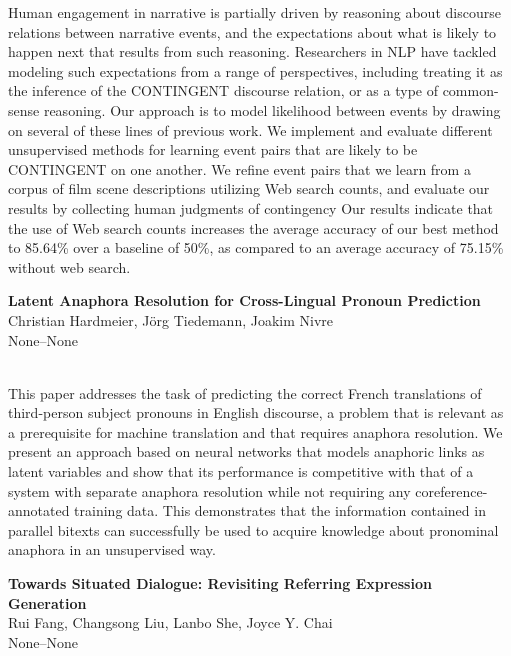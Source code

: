 \documentclass[twoside,makeidx]{book}
\begin{document}
\nopagebreak%
\noindent%
{\small Human engagement in narrative is partially driven by reasoning about discourse relations between narrative events, and the expectations about what is likely to happen next that results from such reasoning. Researchers in NLP have tackled modeling such expectations from a range of perspectives, including treating it as the inference of the CONTINGENT discourse relation, or as a type of common-sense reasoning. Our approach is to model likelihood between events by drawing on several of these lines of previous work. We implement and evaluate different unsupervised methods for learning event pairs that are likely to be CONTINGENT on one another. We refine event pairs that we learn from a corpus of film scene descriptions utilizing Web search counts, and evaluate our results by collecting human judgments of contingency Our results indicate that the use of Web search counts increases the average accuracy of our best method to 85.64\% over a baseline of 50\%, as compared to an average accuracy of 75.15\% without web search.}
\par\vspace{2em}\noindent%
\begin{minipage}{\linewidth}%
\begin{center}
\textbf{\normalsize Latent Anaphora Resolution for Cross-Lingual Pronoun Prediction}\\
\normalsize  Christian Hardmeier,  J\"{o}rg Tiedemann,  Joakim Nivre\\
{\small None--None}\\
\end{center}
\end{minipage}\\[0.5em]
\nopagebreak%
\noindent%
{\small This paper addresses the task of predicting the correct French translations of third-person subject pronouns in English discourse, a problem that is relevant as a prerequisite for machine translation and that requires anaphora resolution. We present an approach based on neural networks that models anaphoric links as latent variables and show that its performance is competitive with that of a system with separate anaphora resolution while not requiring any coreference-annotated training data. This demonstrates that the information contained in parallel bitexts can successfully be used to acquire knowledge about pronominal anaphora in an unsupervised way.}
\par\vspace{2em}\noindent%
\begin{minipage}{\linewidth}%
\begin{center}
\textbf{\normalsize Towards Situated Dialogue: Revisiting Referring Expression Generation}\\
\normalsize  Rui Fang,  Changsong Liu,  Lanbo She,  Joyce Y. Chai\\
{\small None--None}\\
\end{center}
\end{minipage}\\[0.5em]
\end{document}

